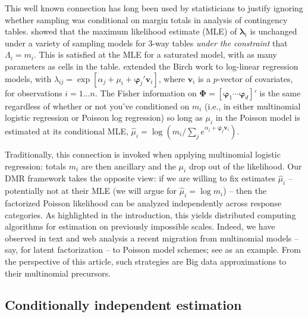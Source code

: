 \documentclass[12pt]{article}
\newcommand{\bs}[1]{\boldsymbol{#1}}
\newcommand{\bm}[1]{\mathbf{#1}}
\begin{document}
This well known connection has long been used by statisticians to justify
ignoring whether sampling was conditional on margin totals in analysis of
contingency tables. \cite{birch_maximum_1963} showed that the maximum
likelihood estimate (MLE) of $\bs{\lambda}_i$ is unchanged under a variety of
sampling models for 3-way tables {\it under the constraint} that $\Lambda_{i}
= m_i$. This is satisfied at the MLE for a saturated model, with as many
parameters as cells in the table. \cite{palmgren_fisher_1981} extended the
Birch work to log-linear regression models, with $\lambda_{ij} = \exp[\alpha_j
+ \mu_i + \bs{\varphi}_j'\bm{v}_i]$, where $\bm{v}_i$ is a $p$-vector of
covariates, for observations $i=1\ldots n$. The Fisher information on
$\bs{\Phi} = [\bs{\varphi}_1 \cdots \bs{\varphi}_d]'$ is the same regardless
of whether or not you've conditioned on $m_i$ (i.e., in either multinomial
logistic regression or Poisson log regression) so long as $\mu_i$ in the
Poisson model is estimated at its conditional MLE, $\hat \mu_i =
\log\left(m_i/\sum_j e^{\alpha_j + \bs{\varphi}_j\bm{v}_i}\right)$.

Traditionally, this connection is invoked when applying multinomial logistic
regression: totals $m_i$ are then ancillary and the $\mu_i$ drop out of the
likelihood.  Our DMR framework takes the opposite view: if we are willing to
fix estimates $\hat\mu_i$ -- potentially not at their MLE (we will argue for
$\hat\mu_i = \log m_i$) -- then the factorized Poisson likelihood can be
analyzed independently across response categories. As highlighted in the
introduction, this yields distributed computing algorithms for estimation
on previously impossible scales.  Indeed, we have observed in text and web
analysis a recent migration from multinomial models -- say, for latent
factorization -- to Poisson model schemes; see
\citet{gopalan_scalable_2013} as an example.  From the perspective of this
article, such strategies are Big data approximations to their
multinomial precursors.

\subsection{Conditionally independent estimation}
\end{document}

